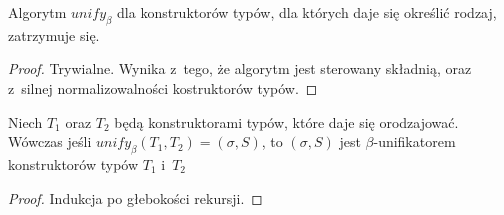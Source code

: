 \documentclass[11pt,leqno]{article}
\begin{document}
\begin{fakt}
Algorytm $unify_\beta$ dla konstruktorów typów, dla których daje się określić rodzaj, zatrzymuje się.
\end{fakt}
\begin{proof}
Trywialne. Wynika z~tego, że algorytm jest sterowany składnią, oraz z~silnej normalizowalności kostruktorów typów.
\end{proof}
\begin{twierdzenie}
Niech $T_1$ oraz $T_2$ będą konstruktorami typów, które daje się orodzajować. Wówczas jeśli
$unify_\beta(T_1, T_2) = (\sigma, S)$, to $(\sigma, S)$ jest $\beta$-unifikatorem konstruktorów typów
$T_1$ i~$T_2$
\end{twierdzenie}
\begin{proof}
Indukcja po głebokości rekursji.


\end{proof}
\end{document}

